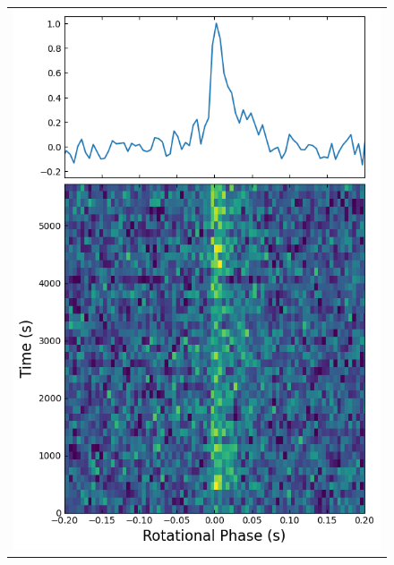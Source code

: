 \documentclass[twocolumn]{emulateapj}
\begin{document}
\begin{figure}[b]
\begin{tabular}[b]{|@{}p{}@{}}
	\includegraphics[width=\linewidth]{plots/ka-band_Aug10.png}
    \end{tabular}
    \quad
    

\end{figure}
\end{document}
